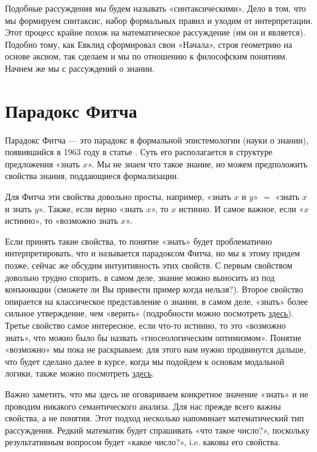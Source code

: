 \documentclass[openany]{book}
\theoremstyle{plain}
\theoremstyle{definition}
\begin{document}
Подобные рассуждения мы будем называть «синтаксическими». Дело в том, что мы формируем синтаксис, набор формальных правил и уходим от интерпретации. Этот процесс крайне похож на математическое рассуждение (им он и является). Подобно тому, как Евклид сформировал свои «Начала», строя геометрию на основе аксиом, так сделаем и мы по отношению к философским понятиям. Начнем же мы с рассуждений о знании.

\section{ Парадокс Фитча }

Парадокс Фитча — это парадокс в формальной эпистемологии (науки о знании), появившийся в 1963 году в статье \cite{Fitch}. Суть его располагается в структуре предложения «знать \(x\)». Мы не знаем что такое знание, но можем предположить свойства знания, поддающиеся формализации.

Для Фитча эти свойства довольно просты, например, «знать \(x\) и \(y\)» \(=\) «знать \(x\) и знать \(y\)». Также, если верно «знать \(x\)», то \(x\) истинно. И самое важное, если «\(x\) истинно», то «возможно знать \(x\)».

Если принять такие свойства, то понятие «знать» будет проблематично интерпретировать, что и называется парадоксом Фитча, но мы к этому придем позже, сейчас же обсудим интуитивность этих свойств. С первым свойством довольно трудно спорить, в самом деле, знание можно выносить из под конъюнкции (сможете ли Вы привести пример когда нельзя?). Второе свойство опирается на классическое представление о знании, в самом деле, «знать» более сильное утверждение, чем «верить» (подробности можно посмотреть \href{https://plato.stanford.edu/entries/knowledge-analysis/}{здесь}). Третье свойство самое интересное, если что-то истинно, то это «возможно знать», что можно было бы назвать «гносеологическим оптимизмом». Понятие «возможно» мы пока не раскрываем; для этого нам нужно продвинутся дальше, что будет сделано далее в курсе, когда мы подойдем к основам модальной логики, также можно посмотреть \href{https://plato.stanford.edu/entries/logic-modal}{здесь}.

Важно заметить, что мы здесь не оговариваем конкретное значение «знать» и не проводим никакого семантического анализа. Для нас прежде всего важны свойства, а не понятия. Этот подход несколько напоминает математический тип рассуждения. Редкий математик будет спрашивать «что такое число?», поскольку результативным вопросом будет «какое число?», i.e. каковы его свойства.
\end{document}
